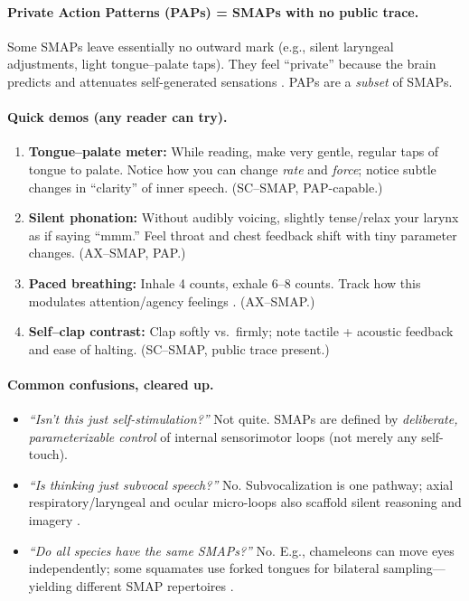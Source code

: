 \paragraph{Private Action Patterns (PAPs) = SMAPs with no public trace.}
Some SMAPs leave essentially no outward mark (e.g., silent laryngeal adjustments, light tongue–palate taps). They feel “private” because the brain predicts and attenuates self-generated sensations \citep{BlakemoreWolpertFrith1998Tickle}. PAPs are a \emph{subset} of SMAPs.

\paragraph{Quick demos (any reader can try).}
\begin{enumerate}
  \item \textbf{Tongue–palate meter:} While reading, make very gentle, regular taps of tongue to palate. Notice how you can change \emph{rate} and \emph{force}; notice subtle changes in “clarity” of inner speech. (SC–SMAP, PAP-capable.)
  \item \textbf{Silent phonation:} Without audibly voicing, slightly tense/relax your larynx as if saying “mmm.” Feel throat and chest feedback shift with tiny parameter changes. (AX–SMAP, PAP.)
  \item \textbf{Paced breathing:} Inhale 4 counts, exhale 6–8 counts. Track how this modulates attention/agency feelings \citep{DelNegro2018BreathingMatters,Haggard2017AgencyReview}. (AX–SMAP.)
  \item \textbf{Self–clap contrast:} Clap softly vs.\ firmly; note tactile + acoustic feedback and ease of halting. (SC–SMAP, public trace present.)
\end{enumerate}

\paragraph{Common confusions, cleared up.}
\begin{itemize}
  \item \emph{“Isn’t this just self-stimulation?”} Not quite. SMAPs are defined by \emph{deliberate, parameterizable control} of internal sensorimotor loops (not merely any self-touch).
  \item \emph{“Is thinking just subvocal speech?”} No. Subvocalization is one pathway; axial respiratory/laryngeal and ocular micro-loops also scaffold silent reasoning and imagery \citep{Guenther2016NeuralControlSpeech,LandNilsson2012AnimalEyes}.
  \item \emph{“Do all species have the same SMAPs?”} No. E.g., chameleons can move eyes independently; some squamates use forked tongues for bilateral sampling—yielding different SMAP repertoires \citep{LandNilsson2012AnimalEyes,Schwenk1994ForkedTongues}.
\end{itemize}

